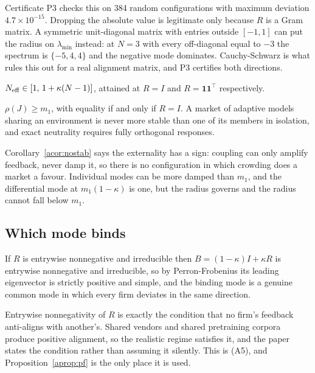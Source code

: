 Certificate P3 checks this on 384 random configurations with maximum deviation $4.7\times 10^{-15}$. Dropping the absolute value is legitimate only because $R$ is a Gram matrix. A symmetric unit-diagonal matrix with entries outside $[-1,1]$ can put the radius on $\lambda_{\min}$ instead: at $N=3$ with every off-diagonal equal to $-3$ the spectrum is $\{-5,4,4\}$ and the negative mode dominates. Cauchy-Schwarz is what rules this out for a real alignment matrix, and P3 certifies both directions.

\begin{acorollary}
\label{acor:range}
$N_{\mathrm{eff}} \in [1,\, 1+\kappa(N-1)]$, attained at $R=I$ and $R=\mathbf{1}\mathbf{1}^{\top}$ respectively.
\end{acorollary}

\begin{acorollary}
\label{acor:nostab}
$\rho(J) \geq m_1$, with equality if and only if $R=I$. A market of adaptive models sharing an environment is never more stable than one of its members in isolation, and exact neutrality requires fully orthogonal responses.
\end{acorollary}

Corollary~\ref{acor:nostab} says the externality has a sign: coupling can only amplify feedback, never damp it, so there is no configuration in which crowding does a market a favour. Individual modes can be more damped than $m_1$, and the differential mode at $m_1(1-\kappa)$ is one, but the radius governs and the radius cannot fall below $m_1$.

\subsection{Which mode binds}

\begin{aproposition}
\label{aprop:pf}
If $R$ is entrywise nonnegative and irreducible then $B=(1-\kappa)I+\kappa R$ is entrywise nonnegative and irreducible, so by Perron-Frobenius its leading eigenvector is strictly positive and simple, and the binding mode is a genuine common mode in which every firm deviates in the same direction.
\end{aproposition}

Entrywise nonnegativity of $R$ is exactly the condition that no firm's feedback anti-aligns with another's. Shared vendors and shared pretraining corpora produce positive alignment, so the realistic regime satisfies it, and the paper states the condition rather than assuming it silently. This is (A5), and Proposition~\ref{aprop:pf} is the only place it is used.

